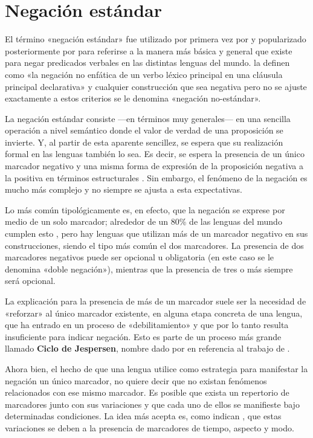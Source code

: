 \section*{Negación estándar}

\noindent El término «negación estándar» fue utilizado por primera vez por \textcolor{MidnightBlue}{\citet{Payne85}} y popularizado posteriormente por \textcolor{MidnightBlue}{\citet{Miestamo2005}} para referirse a la manera más básica y general que existe para negar predicados verbales en las distintas lenguas del mundo. \textcolor{MidnightBlue}{\citet{Auwera2020}} la definen como «la negación no enfática de un verbo léxico principal en una cláusula principal declarativa» y cualquier construcción que sea negativa pero no se ajuste exactamente a estos criterios se le denomina «negación no-estándar».

La negación estándar consiste —en términos muy generales— en una sencilla operación a nivel semántico donde el valor de verdad de una proposición se invierte. Y, al partir de esta aparente sencillez, se espera que su realización formal en las lenguas también lo sea. Es decir, se espera la presencia de un único marcador negativo y una misma forma de expresión de la proposición negativa a la positiva en términos estructurales \textcolor{MidnightBlue}{\citep{Auwera2020}}. Sin embargo, el fenómeno de la negación es mucho más complejo y no siempre se ajusta a esta expectativas.

Lo más común tipológicamente es, en efecto, que la negación se exprese por medio de un solo marcador; alrededor de un 80\% de las lenguas del mundo cumplen esto \textcolor{MidnightBlue}{\citep{VanAlsenoy2014,morfemas,Vossen2016}}, pero hay lenguas que utilizan más de un marcador negativo en sus construcciones, siendo el tipo más común el dos marcadores. La presencia de dos marcadores negativos puede ser opcional u obligatoria (en este caso se le denomina «doble negación»), mientras que la presencia de tres o más siempre será opcional.

La explicación para la presencia de más de un marcador suele ser la necesidad de «reforzar» al único marcador existente, en alguna etapa concreta de una lengua, que ha entrado en un proceso de «debilitamiento» y que por lo tanto resulta insuficiente para indicar negación. Esto es parte de un proceso más grande llamado \textbf{Ciclo de Jespersen}, nombre dado por \textcolor{MidnightBlue}{\citet{Dahl1979}} en referencia al trabajo de \textcolor{MidnightBlue}{\citet{Jespersen1917}}.

Ahora bien, el hecho de que una lengua utilice como estrategia para manifestar la negación un único marcador, no quiere decir que no existan fenómenos relacionados con ese mismo marcador. Es posible que exista un repertorio de marcadores junto con sus variaciones y que cada uno de ellos se manifieste bajo determinadas condiciones. La idea más acepta es, como indican \textcolor{MidnightBlue}{\citet{Auwera2020}}, que estas variaciones se deben a la presencia de marcadores de tiempo, aspecto y modo.
